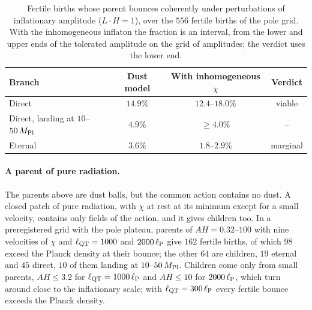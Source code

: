 \documentclass[11pt,a4paper]{article}
\newcommand{\Mpl}{M_{\rm Pl}}
\begin{document}
\begin{table}[t]
\centering\small
\caption{Fertile births whose parent bounces coherently under perturbations of inflationary amplitude ($L\cdot H=1$), over the $556$ fertile births of the pole grid. With the inhomogeneous inflaton the fraction is an interval, from the lower and upper ends of the tolerated amplitude on the grid of amplitudes; the verdict uses the lower end.}
\label{tab:coherence}
\begin{tabular}{lccc}
\toprule
Branch & Dust model & With inhomogeneous $\chi$ & Verdict\\
\midrule
Direct & $14.9\%$ & $12.4$--$18.0\%$ & viable\\
Direct, landing at $10$--$50\,\Mpl$ & $4.9\%$ & $\ge4.0\%$ & --\\
Eternal & $3.6\%$ & $1.8$--$2.9\%$ & marginal\\
\bottomrule
\end{tabular}
\end{table}

\paragraph{A parent of pure radiation.}
The parents above are dust balls, but the common action contains no dust.
A closed patch of pure radiation, with $\chi$ at rest at its minimum except for a small velocity, contains only fields of the action, and it gives children too.
In a preregistered grid with the pole plateau, parents of $AH=0.32$--$100$ with nine velocities of $\chi$ and $\ell_{\rm QT}=1000$ and $2000\,\ell_{\rm P}$ give $162$ fertile births, of which $98$ exceed the Planck density at their bounce; the other $64$ are children, $19$ eternal and $45$ direct, $10$ of them landing at $10$--$50\,\Mpl$.
Children come only from small parents, $AH\le3.2$ for $\ell_{\rm QT}=1000\,\ell_{\rm P}$ and $AH\le10$ for $2000\,\ell_{\rm P}$, which turn around close to the inflationary scale; with $\ell_{\rm QT}=300\,\ell_{\rm P}$ every fertile bounce exceeds the Planck density.
\end{document}
